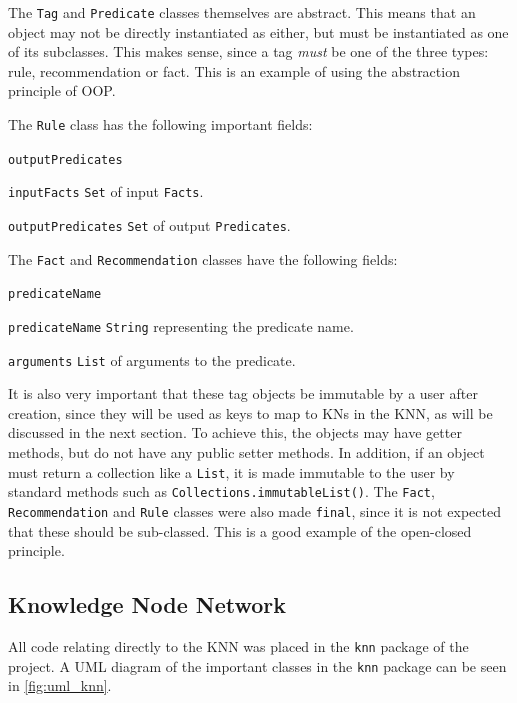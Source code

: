 \documentclass[titlepage,11pt]{article}
\newcommand{\code}[1]{\texttt{#1}}
\begin{document}
The \code{Tag} and \code{Predicate} classes themselves are abstract. This means that an object may not be directly instantiated as either, but must be instantiated as one of its subclasses. This makes sense, since a tag \emph{must} be one of the three types: rule, recommendation or fact. This is an example of using the abstraction principle of OOP.

The \code{Rule} class has the following important fields:

\begin{labeling}{\code{outputPredicates}}
	\item[\code{inputFacts}] \code{Set} of input \code{Facts}.
	\item[\code{outputPredicates}] \code{Set} of output \code{Predicates}.
\end{labeling}

The \code{Fact} and \code{Recommendation} classes have the following fields:

\begin{labeling}{\code{predicateName}}
	\item[\code{predicateName}] \code{String} representing the predicate name.
	\item[\code{arguments}] \code{List} of arguments to the predicate.
\end{labeling}

It is also very important that these tag objects be immutable by a user after creation, since they will be used as keys to map to KNs in the KNN, as will be discussed in the next section. To achieve this, the objects may have getter methods, but do not have any public setter methods. In addition, if an object must return a collection like a \code{List}, it is made immutable to the user by standard methods such as \code{Collections.immutableList()}. The \code{Fact}, \code{Recommendation} and \code{Rule} classes were also made \code{final}, since it is not expected that these should be sub-classed. This is a good example of the open-closed principle.

\subsection{Knowledge Node Network}

All code relating directly to the KNN was placed in the \code{knn} package of the project. A UML diagram of the important classes in the \code{knn} package can be seen in \cref{fig:uml_knn}.
\end{document}
